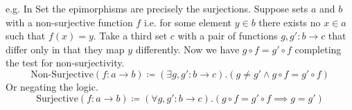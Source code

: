e.g. In Set the epimorphisms are precisely the surjections.
Suppose sets $a$ and $b$ with a non-surjective function $f$ i.e. for some
element $y\in b$ there exists no $x\in a$ such that $f(x) = y$. Take a third
set $c$ with a pair of functions $g, g':b\to c$ that differ only in that
they map $y$ differently. Now we have $g\circ f = g'\circ f$ completing the
test for non-surjectivity.
\[\text{Non-Surjective}(f:a\to b) \coloneq(\exists g, g':b\to c).(g \neq g'
  \land g\circ f = g'\circ f)\] Or negating the logic.
\[\text{Surjective}(f:a\to b) \coloneq(\forall g, g':b\to c).(g\circ f =
  g'\circ f \implies g=g')\]